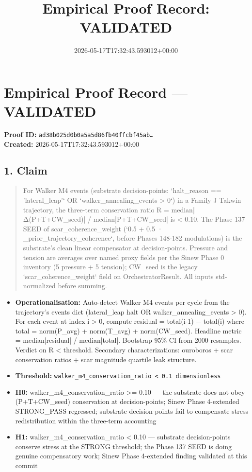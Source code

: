 \documentclass{article}
\title{Empirical Proof Record: VALIDATED}
\date{2026-05-17T17:32:43.593012+00:00}
\begin{document}
\maketitle
\section*{Empirical Proof Record --- \textcolor{validated}{\textbf{VALIDATED}}}
\textbf{Proof ID:} \texttt{ad38b025d0b0a5a5d86fb40ffcbf45ab\dots}\\
\textbf{Created:} 2026-05-17T17:32:43.593012+00:00
\subsection*{1. Claim}
\begin{quote}For Walker M4 events (substrate decision-points: `halt\_reason == 'lateral\_leap'` OR `walker\_annealing\_events > 0`) in a Family J Takwin trajectory, the three-term conservation ratio R = median|Δ(P+T+CW\_seed)| / median|P+T+CW\_seed| is < 0.10. The Phase 137 SEED of scar\_coherence\_weight (`0.5 + 0.5 · \_prior\_trajectory\_coherence`, before Phases 148-182 modulations) is the substrate's clean linear compensator at decision-points. Pressure and tension are averages over named proxy fields per the Sinew Phase 0 inventory (5 pressure + 5 tension); CW\_seed is the legacy `scar\_coherence\_weight` field on OrchestratorResult. All inputs std-normalized before summing.\end{quote}
\begin{itemize}
\item \textbf{Operationalisation:} Auto-detect Walker M4 events per cycle from the trajectory's events dict (lateral\_leap halt OR walker\_annealing\_events > 0). For each event at index i > 0, compute residual = total(i-1) − total(i) where total = norm(P\_avg) + norm(T\_avg) + norm(CW\_seed). Headline metric = median|residual| / median|total|. Bootstrap 95\% CI from 2000 resamples. Verdict on R < threshold. Secondary characterizations: ouroboros + scar conservation ratios + scar magnitude quartile leak structure.
\item \textbf{Threshold:} \texttt{walker\_m4\_conservation\_ratio < 0.1 dimensionless}
\item \textbf{H0:} walker\_m4\_conservation\_ratio >= 0.10 — the substrate does not obey (P+T+CW\_seed) conservation at decision-points; Sinew Phase 4-extended STRONG\_PASS regressed; substrate decision-points fail to compensate stress redistribution within the three-term accounting
\item \textbf{H1:} walker\_m4\_conservation\_ratio < 0.10 — substrate decision-points conserve stress at the STRONG threshold; the Phase 137 SEED is doing genuine compensatory work; Sinew Phase 4-extended finding validated at this commit
\end{itemize}
\end{document}
